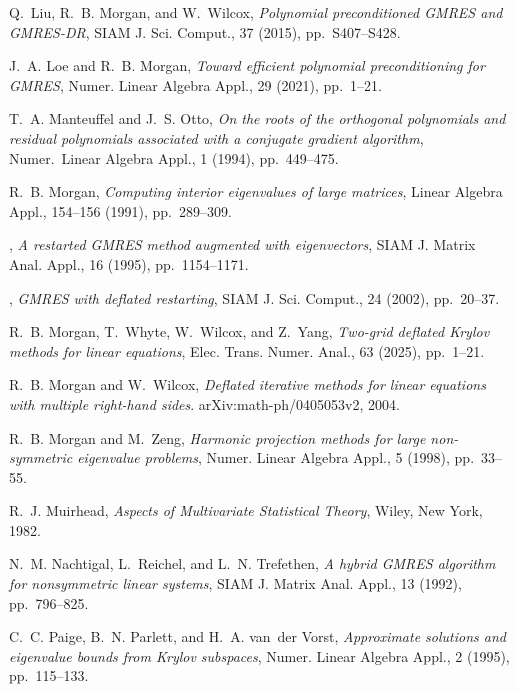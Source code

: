\documentclass{siamart}
\begin{document}
\begin{thebibliography}{10}
{\sc Q.~Liu, R.~B. Morgan, and W.~Wilcox}, {\em Polynomial preconditioned
  {GMRES} and {GMRES-DR}}, SIAM J. Sci. Comput., 37 (2015), pp.~S407--S428.

{\sc J.~A. Loe and R.~B. Morgan}, {\em Toward efficient polynomial
  preconditioning for {GMRES}}, Numer. Linear Algebra Appl., 29 (2021),
  pp.~1--21.

{\sc T.~A. Manteuffel and J.~S. Otto}, {\em On the roots of the orthogonal
  polynomials and residual polynomials associated with a conjugate gradient
  algorithm}, Numer.\ Linear Algebra Appl., 1 (1994), pp.~449--475.

{\sc R.~B. Morgan}, {\em Computing interior eigenvalues of large matrices},
  Linear Algebra Appl., 154--156 (1991), pp.~289--309.

\leavevmode\vrule height 2pt depth -1.6pt width 23pt, {\em A restarted {GMRES}
  method augmented with eigenvectors}, SIAM J. Matrix Anal. Appl., 16 (1995),
  pp.~1154--1171.

\leavevmode\vrule height 2pt depth -1.6pt width 23pt, {\em {GMRES} with
  deflated restarting}, SIAM J. Sci. Comput., 24 (2002), pp.~20--37.

{\sc R.~B. Morgan, T.~Whyte, W.~Wilcox, and Z.~Yang}, {\em Two-grid deflated
  {Krylov} methods for linear equations}, Elec. Trans. Numer. Anal., 63 (2025),
  pp.~1--21.

{\sc R.~B. Morgan and W.~Wilcox}, {\em Deflated iterative methods for linear
  equations with multiple right-hand sides}.
\newblock arXiv:math-ph/0405053v2, 2004.

{\sc R.~B. Morgan and M.~Zeng}, {\em Harmonic projection methods for large
  non-symmetric eigenvalue problems}, Numer. Linear Algebra Appl., 5 (1998),
  pp.~33--55.

{\sc R.~J. Muirhead}, {\em Aspects of Multivariate Statistical Theory}, Wiley,
  New York, 1982.

{\sc N.~M. Nachtigal, L.~Reichel, and L.~N. Trefethen}, {\em A hybrid {GMRES}
  algorithm for nonsymmetric linear systems}, SIAM J. Matrix Anal. Appl., 13
  (1992), pp.~796--825.

{\sc C.~C. Paige, B.~N. Parlett, and H.~A. van~der Vorst}, {\em Approximate
  solutions and eigenvalue bounds from {K}rylov subspaces}, Numer. Linear
  Algebra Appl., 2 (1995), pp.~115--133.


\end{thebibliography}
\end{document}
